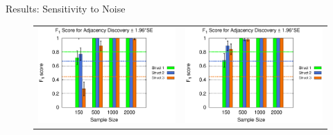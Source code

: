 \documentclass[hyperref={pdfpagelabels=false}]{beamer}
\begin{document}
\begin{frame}{Results: Sensitivity to Noise}
			\begin{figure}[!ht]
				\begin{center}
					\centering
					\begin{tabular}{>{\centering}m{1.5in} >{\centering\arraybackslash}m{1.5in}}
						\includegraphics[width=1.1\linewidth]{figures/F1A_single.eps} &\includegraphics[width=1.1\linewidth]{figures/F1A_single_noisy.eps}\\

\end{tabular}
\end{center}
\end{figure}
\end{frame}
\end{document}
